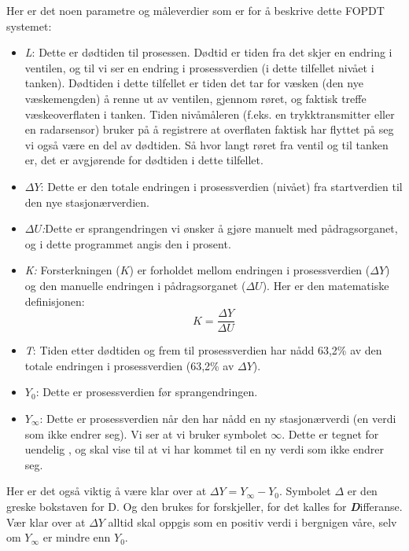 \documentclass{minmal}
\begin{document}
Her er det noen parametre og måleverdier som er for å beskrive dette FOPDT systemet:
\begin{itemize}
    \item \textit{L}: Dette er dødtiden til prosessen.  Dødtid er tiden fra det skjer en endring i ventilen, og til vi ser en endring i prosessverdien (i dette tilfellet nivået i tanken).  Dødtiden i dette tilfellet er tiden det tar for væsken (den nye væskemengden) å renne ut av ventilen, gjennom røret, og faktisk treffe væskeoverflaten i tanken.   Tiden nivåmåleren (f.eks. en trykktransmitter eller en radarsensor) bruker på å registrere at overflaten faktisk har flyttet på seg vi også være en del av dødtiden.  Så hvor langt røret fra ventil og til tanken er, det er avgjørende for dødtiden i dette tilfellet.  
    \item \textit{$\Delta Y$}: Dette er den totale endringen i prosessverdien (nivået) fra startverdien til den nye stasjonærverdien.  
    \item\textit{$\Delta U$:}Dette er sprangendringen vi ønsker å gjøre manuelt med pådragsorganet, og i dette programmet angis den i prosent.
    \item\textit{K:} Forsterkningen (\(K\)) er forholdet mellom endringen i prosessverdien ($\Delta Y$) og den manuelle endringen i  pådragsorganet ($\Delta U$).   Her er den matematiske definisjonen:\\
    
    \[K=\frac{\Delta Y}{\Delta U}\]
    \item \textit{T}: Tiden etter dødtiden og frem til prosessverdien har nådd 63,2\% av den totale endringen i prosessverdien (63,2\% av $\Delta Y$).
    \item \textit{$Y_0$}: Dette er prosessverdien før sprangendringen. 
    \item \textit{$Y_\infty$}: Dette er prosessverdien når den har nådd en ny stasjonærverdi (en verdi som ikke endrer seg).  Vi ser at vi bruker symbolet $\infty$.  Dette er tegnet for uendelig , og skal vise til at vi har kommet til en ny verdi som ikke endrer seg.  
\end{itemize}
Her er det også viktig å være klar over at $\Delta Y=Y_\infty - Y_0$.  Symbolet $\Delta$ er den greske bokstaven for D.  Og den brukes for forskjeller, for det kalles for \textbf{\textit{D}}ifferanse. Vær klar over at $\Delta Y$ alltid skal oppgis som en positiv verdi i bergnigen våre, selv om $Y_\infty$ er mindre enn $Y_0$.  
\end{document}

